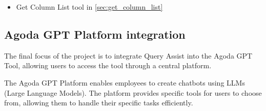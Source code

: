     \begin{itemize}
      \item Get Column List tool in \ref{sec:get_column_list}
    \end{itemize}

    \subsection{Agoda GPT Platform integration}
    The final focus of the project is to integrate Query Assist into the Agoda GPT Tool, allowing users to access the tool through a central platform.

    The Agoda GPT Platform enables employees to create chatbots using LLMs (Large Language Models). The platform provides specific tools for users to choose from, allowing them to handle their specific tasks efficiently.






